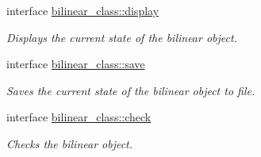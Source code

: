 \begin{DoxyCompactItemize}
interface \hyperlink{interfacebilinear__class_1_1display}{bilinear\+\_\+class\+::display}
\begin{DoxyCompactList}\small\item\em Displays the current state of the bilinear object. \end{DoxyCompactList}\item 
interface \hyperlink{interfacebilinear__class_1_1save}{bilinear\+\_\+class\+::save}
\begin{DoxyCompactList}\small\item\em Saves the current state of the bilinear object to file. \end{DoxyCompactList}\item 
interface \hyperlink{interfacebilinear__class_1_1check}{bilinear\+\_\+class\+::check}
\begin{DoxyCompactList}\small\item\em Checks the bilinear object. \end{DoxyCompactList}\end{DoxyCompactItemize}

